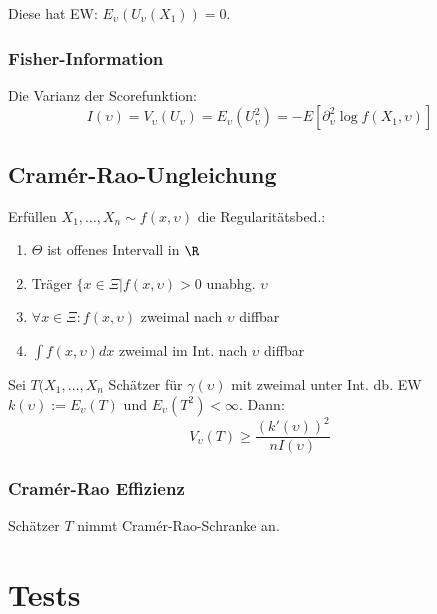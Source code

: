 Diese hat EW: \(E_\upsilon(U_\upsilon(X_1)) = 0\).

\subsubsection*{Fisher-Information}

Die Varianz der Scorefunktion:
\[ I(\upsilon) = V_\upsilon(U_\upsilon) = E_\upsilon(U_\upsilon^2) = -E\left[ \partial_\upsilon^2 \log f(X_1,\upsilon) \right]\]

\subsection*{Cram\'er-Rao-Ungleichung}

Erfüllen \(X_1,\dots,X_n \sim f(x,\upsilon)\) die Regularitätsbed.:
\begin{enumerate}
	\item \(\Theta\) ist offenes Intervall in \(\R\)
	\item Träger \(\{x \in \Xi | f(x,\upsilon) > 0\) unabhg. \(\upsilon\)
	\item \(\forall x \in \Xi : f(x,\upsilon)\) zweimal nach \(\upsilon\) diffbar
	\item \(\int f(x,\upsilon) dx\) zweimal im Int. nach \(\upsilon\) diffbar
\end{enumerate}
Sei \(T(X_1,\dots,X_n\) Schätzer für \(\gamma(\upsilon)\) mit zweimal unter Int. db. EW \(k(\upsilon) := E_\upsilon(T)\) und \(E_\upsilon(T^2) < \infty\). Dann:
\[ V_\upsilon(T) \geq \frac{(k'(\upsilon))^2}{nI(\upsilon)} \]

\subsubsection*{Cram\'er-Rao Effizienz}

Schätzer \(T\) nimmt Cram\'er-Rao-Schranke an.

\section*{Tests}
